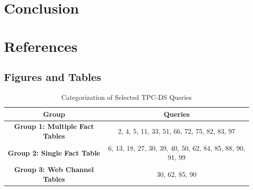\documentclass[conference]{IEEEtran}
\begin{document}
\section{Conclusion}
\section{References}

\subsection{Figures and Tables}
\begin{table}[htbp]
	\caption{Categorization of Selected TPC-DS Queries}
	\begin{center}
		\begin{tabular}{|c|c|}
			\hline
			\textbf{Group}                         & \textbf{Queries}                                          \\
			\hline
			\textbf{Group 1: Multiple Fact Tables} & 2, 4, 5, 11, 33, 51, 66, 72, 75, 82, 83, 97               \\
			\hline
			\textbf{Group 2: Single Fact Table}    & 6, 13, 18, 27, 30, 39, 40, 50, 62, 84, 85, 88, 90, 91, 99 \\
			\hline
			\textbf{Group 3: Web Channel Tables}   & 30, 62, 85, 90                                            \\
			\hline
		\end{tabular}
		\label{table:query-categorization}
	\end{center}
\end{table}
\end{document}
